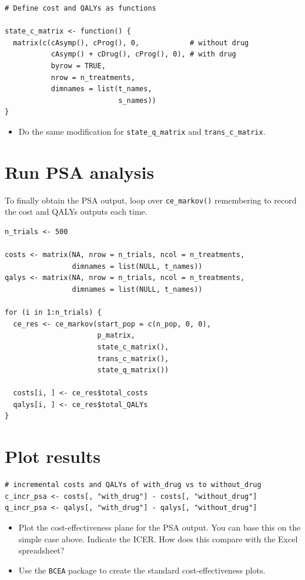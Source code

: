 \begin{verbatim}
# Define cost and QALYs as functions

state_c_matrix <- function() {
  matrix(c(cAsymp(), cProg(), 0,            # without drug
           cAsymp() + cDrug(), cProg(), 0), # with drug
           byrow = TRUE,
           nrow = n_treatments,
           dimnames = list(t_names,
                           s_names))
}
\end{verbatim}

\begin{itemize}
\item Do the same modification for \texttt{state\_q\_matrix} and \texttt{trans\_c\_matrix}.
\end{itemize}


%
\section{Run PSA analysis}
To finally obtain the PSA output, loop over \texttt{ce\_markov()} remembering to record the cost and QALYs outputs each time.

\begin{verbatim}
n_trials <- 500

costs <- matrix(NA, nrow = n_trials, ncol = n_treatments,
                dimnames = list(NULL, t_names))
qalys <- matrix(NA, nrow = n_trials, ncol = n_treatments,
                dimnames = list(NULL, t_names))

for (i in 1:n_trials) {
  ce_res <- ce_markov(start_pop = c(n_pop, 0, 0),
                      p_matrix,
                      state_c_matrix(),
                      trans_c_matrix(),
                      state_q_matrix())
  
  costs[i, ] <- ce_res$total_costs
  qalys[i, ] <- ce_res$total_QALYs
}
\end{verbatim}


%
\section{Plot results}

\begin{verbatim}
# incremental costs and QALYs of with_drug vs to without_drug
c_incr_psa <- costs[, "with_drug"] - costs[, "without_drug"]
q_incr_psa <- qalys[, "with_drug"] - qalys[, "without_drug"]
\end{verbatim}

\begin{itemize}
\item Plot the cost-effectiveness plane for the PSA output. You can base this on the simple case above. Indicate the ICER. How does this compare with the Excel spreadsheet?
\item Use the \texttt{BCEA} package to create the standard cost-effectiveness plots.
\end{itemize}


